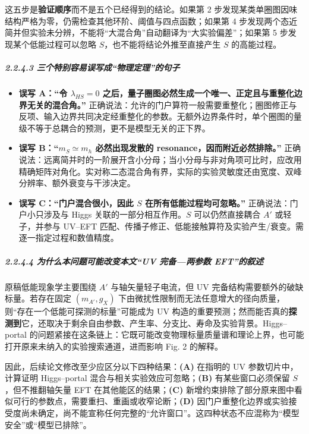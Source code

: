 \documentclass[
]{article}
\providecommand{\tightlist}{%
  \setlength{\itemsep}{0pt}\setlength{\parskip}{0pt}}
\begin{document}
这五步是\textbf{验证顺序}而不是五个已经得到的结论。如果第 2
步发现某类单圈图因味结构严格为零，仍需检查其他环阶、阈值与四点函数；如果第
4
步发现两个态近简并但实验未分辨，不能将``大混合角''自动翻译为``大实验偏差''；如果第
5 步发现某个低能过程可以忽略 \(S\)，也不能将结论外推至直接产生 \(S\)
的高能过程。

\subparagraph{2.2.4.3
三个特别容易误写成``物理定理''的句子}\label{ux4e09ux4e2aux7279ux522bux5bb9ux6613ux8befux5199ux6210ux7269ux7406ux5b9aux7406ux7684ux53e5ux5b50}

\begin{itemize}
\tightlist
\item
  \textbf{误写 A：``令 \(\lambda_{HS}=0\)
  之后，量子圈图必然生成一个唯一、正定且与重整化边界无关的混合角。''}
  正确说法：允许的门户算符一般需要重整化；圈图修正与反项、输入边界共同决定经重整化的参数。无额外边界条件时，单个圈图的量级不等于总耦合的预测，更不是模型无关的正下界。
\item
  \textbf{误写 B：``\(m_S\simeq m_h\) 必然出现发散的
  resonance，因而附近必然排除。''}
  正确说法：远离简并时的一阶展开含小分母；当小分母与非对角项可比时，应改用精确矩阵对角化。实对称二态混合角有界，实际的实验灵敏度还由宽度、双峰分辨率、额外衰变与干涉决定。
\item
  \textbf{误写 C：``门户混合很小，因此 \(S\) 在所有低能过程均可忽略。''}
  正确说法：门户小只涉及与 Higgs 关联的一部分相互作用。\(S\)
  可以仍然直接耦合 \(A'\) 或轻子，并参与 UV--EFT
  匹配、传播子修正、低能接触算符及实验产生/衰变。需逐一指定过程和数值精度。
\end{itemize}

\subparagraph{2.2.4.4 为什么本问题可能改变本文``UV 完备---两参数
EFT''的叙述}\label{ux4e3aux4ec0ux4e48ux672cux95eeux9898ux53efux80fdux6539ux53d8ux672cux6587uv-ux5b8cux5907ux4e24ux53c2ux6570-eftux7684ux53d9ux8ff0}

原稿低能现象学主要围绕 \(A'\) 与轴矢量轻子电流，但 UV
完备结构需要额外的破缺标量。若存在固定 \((m_{A'},g_X)\)
下由微扰性限制而无法任意增大的径向质量，则``存在一个低能可探测的标量''可能成为
UV
构造的重要预测；然而能否真的\textbf{探测到}它，还取决于剩余自由参数、产生率、分支比、寿命及实验背景。Higgs--portal
的问题紧接在这条链上：它既可能改变物理标量质量谱和理论上界，也可能打开原来未纳入的实验搜索通道，进而影响
Fig. 2 的解释。

因此，后续论文修改至少应区分以下四种结果：\textbf{(A)} 在指明的 UV
参数切片中，计算证明 Higgs--portal
混合与相关实验效应可忽略；\textbf{(B)} 有某些窗口必须保留
\(S\)，但不推翻轴矢量 EFT 在其他能区的结果；\textbf{(C)}
新增约束排除了部分原来图中看似可行的参数点，需要重扫、重画或收窄论断；\textbf{(D)}
因门户重整化边界或实验接受度尚未确定，尚不能宣称任何完整的``允许窗口''。这四种状态不应混称为``模型安全''或``模型已排除''。
\end{document}
